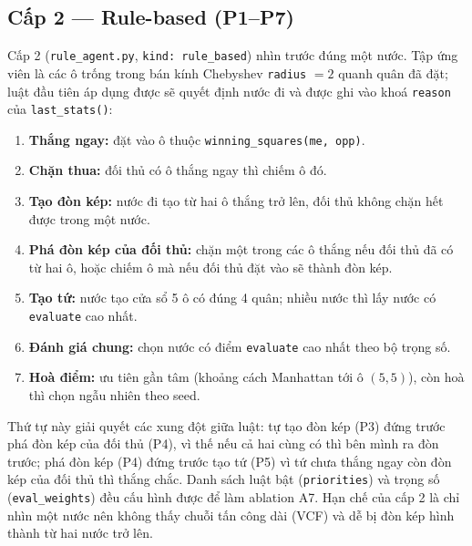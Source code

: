 \subsection{Cấp 2 --- Rule-based (P1--P7)}
Cấp 2 (\texttt{rule\_agent.py}, \texttt{kind: rule\_based}) nhìn trước đúng một nước. Tập ứng viên là các ô trống trong bán kính Chebyshev \texttt{radius} $=2$ quanh quân đã đặt; luật đầu tiên áp dụng được sẽ quyết định nước đi và được ghi vào khoá \texttt{reason} của \texttt{last\_stats()}:
\begin{enumerate}
  \item[\textbf{P1}] \textbf{Thắng ngay:} đặt vào ô thuộc \texttt{winning\_squares(me, opp)}.
  \item[\textbf{P2}] \textbf{Chặn thua:} đối thủ có ô thắng ngay thì chiếm ô đó.
  \item[\textbf{P3}] \textbf{Tạo đòn kép:} nước đi tạo từ hai ô thắng trở lên, đối thủ không chặn hết được trong một nước.
  \item[\textbf{P4}] \textbf{Phá đòn kép của đối thủ:} chặn một trong các ô thắng nếu đối thủ đã có từ hai ô, hoặc chiếm ô mà nếu đối thủ đặt vào sẽ thành đòn kép.
  \item[\textbf{P5}] \textbf{Tạo tứ:} nước tạo cửa sổ 5 ô có đúng 4 quân; nhiều nước thì lấy nước có \texttt{evaluate} cao nhất.
  \item[\textbf{P6}] \textbf{Đánh giá chung:} chọn nước có điểm \texttt{evaluate} cao nhất theo bộ trọng số.
  \item[\textbf{P7}] \textbf{Hoà điểm:} ưu tiên gần tâm (khoảng cách Manhattan tới ô $(5,5)$), còn hoà thì chọn ngẫu nhiên theo seed.
\end{enumerate}
Thứ tự này giải quyết các xung đột giữa luật: tự tạo đòn kép (P3) đứng trước phá đòn kép của đối thủ (P4), vì thế nếu cả hai cùng có thì bên mình ra đòn trước; phá đòn kép (P4) đứng trước tạo tứ (P5) vì tứ chưa thắng ngay còn đòn kép của đối thủ thì thắng chắc. Danh sách luật bật (\texttt{priorities}) và trọng số (\texttt{eval\_weights}) đều cấu hình được để làm ablation A7. Hạn chế của cấp 2 là chỉ nhìn một nước nên không thấy chuỗi tấn công dài (VCF) và dễ bị đòn kép hình thành từ hai nước trở lên.
